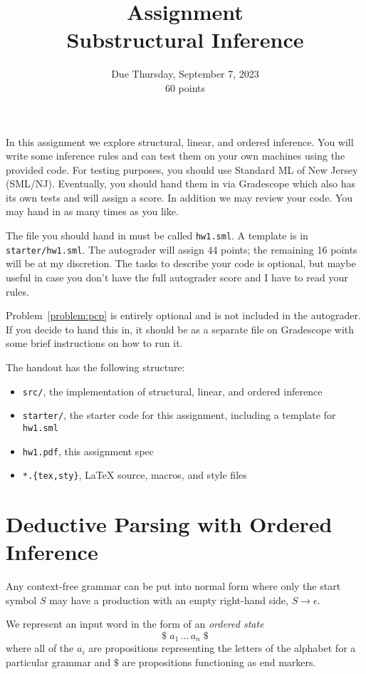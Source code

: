 \documentclass[11pt]{article}
\title{Assignment \lecnum \\ Substructural Inference}
\date{Due Thursday, September 7, 2023 \\ 60 points}
\begin{document}
\maketitle

In this assignment we explore structural, linear, and ordered inference.
You will write some inference rules and can test them on your own
machines using the provided code.  For testing purposes, you should use
Standard ML of New Jersey (SML/NJ).  Eventually, you should hand them in
via Gradescope which also has its own tests and will assign a score.  In
addition we may review your code.  You may hand in as many times as you
like.

The file you should hand in must be called \texttt{hw1.sml}. A template
is in \texttt{starter/hw1.sml}.  The autograder will assign 44 points;
the remaining 16 points will be at my discretion.  The tasks to describe
your code is optional, but maybe useful in case you don't have the full
autograder score and I have to read your rules.

Problem~\ref{problem:pcp} is entirely optional and is not included in
the autograder.  If you decide to hand this in, it should be as a
separate file on Gradescope with some brief instructions on how to run
it.

The handout has the
following structure:
\begin{itemize}
\item \texttt{src/}, the implementation of structural, linear, and ordered inference
\item \texttt{starter/}, the starter code for this assignment, including a template
  for \texttt{hw1.sml}
\item \texttt{hw1.pdf}, this assignment spec
\item \texttt{*.\{tex,sty\}}, LaTeX source, macros, and style files
\end{itemize}
  

\section{Deductive Parsing with Ordered Inference}
\label{problem:parsing-ordered}

Any context-free grammar can be put into normal form where only the start symbol $S$ may
have a production with an empty right-hand side, $S \rightarrow \epsilon$.

We represent an input word in the form of an \emph{ordered state}
\[
  \$\; a_1\, \ldots\, a_n\; \$
\]
where all of the $a_i$ are propositions representing the letters of the
alphabet for a particular grammar and $\$$ are propositions functioning
as end markers.
\end{document}

